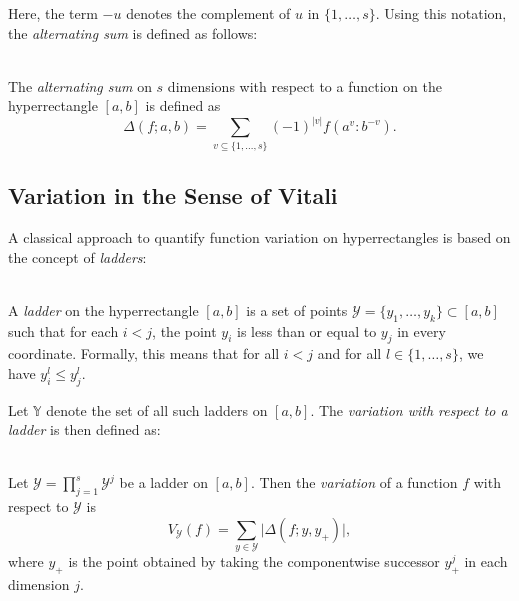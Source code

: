 Here, the term $-u$ denotes the complement of $u$ in $\{1, \dots, s\}$. Using
this notation, the \emph{alternating sum} is defined as follows:

\begin{definition} \ \\
    The \emph{alternating sum} on $s$ dimensions with respect to a function on
    the hyperrectangle $[a,b]$ is defined as
    \begin{equation*}
        \Delta(f; a, b) = \sum_{v \subseteq \{1,\dots,s\}} (-1)^{|v|} f(a^v:b^{-v}).
    \end{equation*}
\end{definition}

\subsection{Variation in the Sense of Vitali}
\label{sec:vitali-variation}

A classical approach to quantify function variation on hyperrectangles is based
on the concept of \emph{ladders}:

\begin{definition}[Ladder] \ \\
    A \emph{ladder} on the hyperrectangle $[a,b]$ is a set of points
    $\mathcal{Y} = \{y_1, \dots, y_k\} \subset [a,b]$ such that for each $i <
    j$, the point $y_i$ is less than or equal to $y_j$ in every coordinate.
    Formally, this means that for all $i < j$ and for all $l \in \{1, \dots,
    s\}$, we have $y_i^l \leq y_j^l$.
\end{definition}

Let $\mathbb{Y}$ denote the set of all such ladders on $[a,b]$. The
\emph{variation with respect to a ladder} is then defined as:

\begin{definition} \ \\
    Let $\mathcal{Y} = \prod\limits_{j=1}^s \mathcal{Y}^j$ be a ladder on
    $[a,b]$. Then the \emph{variation} of a function $f$ with respect to
    $\mathcal{Y}$ is
    \begin{equation*}
        V_\mathcal{Y}(f) = \sum_{y \in \mathcal{Y}} \big| \Delta(f; y, y_+) \big|,
    \end{equation*}
    where $y_+$ is the point obtained by taking the componentwise successor
    $y^j_+$ in each dimension $j$.
\end{definition}

